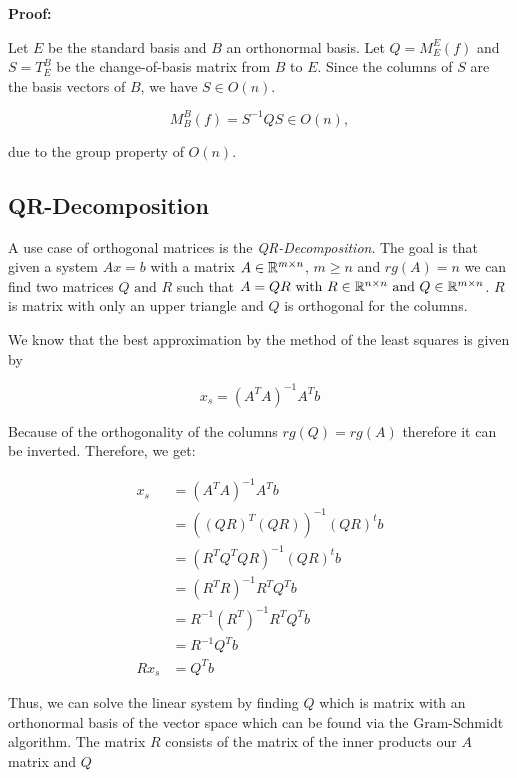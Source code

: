 \textbf{Proof:} 

Let \( E \) be the standard basis and \( B \) an orthonormal basis. Let  
\( Q = M_E^E(f) \) and \( S = T_E^B \) be the change-of-basis matrix from \( B \) to \( E \).  
Since the columns of \( S \) are the basis vectors of \( B \), we have \( S \in O(n) \).  

\[
    M_B^B(f) = S^{-1} Q S \in O(n),
\]

due to the group property of \( O(n) \).

\QED

\subsection{QR-Decomposition}

A use case of orthogonal matrices is the \emph{QR-Decomposition}. The goal is that given a system 
\( Ax = b\) with a matrix \(A\in \mathbb{R}^{m \times n}\), \(m \ge n\) and \(rg(A) = n\) we can find 
two matrices \(Q \text{ and } R\) such that \(A = QR \text{ with } R\in \mathbb{R}^{n \times n} 
\text{ and } Q \in \mathbb{R}^{m \times n}\). \(R\) is matrix with only an upper triangle and 
\(Q\) is orthogonal for the columns.
\vspace{\baselineskip}

We know that the best approximation by the method of the least squares is given by

\[
    x_s = (A^T A)^{-1} A^T b
\]

Because of the orthogonality of the columns \(rg(Q) = rg(A)\) therefore it can be inverted. Therefore,
we get:

\begin{align*}
    x_s &= (A^T A)^{-1} A^T b \\
        &= ((QR)^T (QR))^{-1} (QR)^t b \\
        &= (R^T Q^T QR)^{-1} (QR)^t b \\
        &= (R^T R)^{-1} R^T Q^T b \\
        &=  R^{-1} (R^T)^{-1} R^T Q^T b \\
        &=  R^{-1} Q^T b \\
    Rx_s&= Q^T b
\end{align*}

Thus, we can solve the linear system by finding \(Q\) which is matrix with an orthonormal basis of the 
vector space which can be found via the Gram-Schmidt algorithm. The matrix \(R\) consists of the matrix of the 
inner products our \(A\) matrix and \(Q\)

